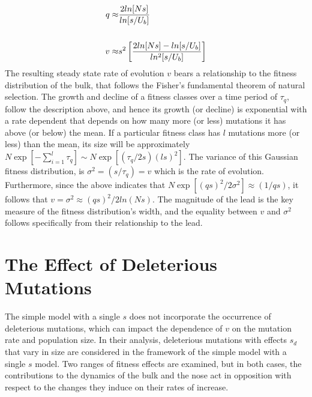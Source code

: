 \documentclass[12pt, two column]{article}
\begin{document}
\begin{equation}
\begin{aligned}
q \approx & {2ln[Ns] \over ln[s/U_b]} \\   
\\
v \approx & s^2 \left[{2ln[Ns] - ln[s/U_b] \over ln^2[s/U_b]}\right]
\end{aligned}
\end{equation} 
The resulting steady state rate of evolution $v$ bears a relationship to the fitness distribution of the bulk, that follows the Fisher's fundamental theorem of natural selection.  The growth and decline of a fitness classes over a time period of $\tau_q$, follow the description above, and hence its growth (or decline) is exponential with a rate dependent that depends on how many more (or less) mutations it has above (or below) the mean.  If a particular fitness class has $l$ mutations  more (or less) than the mean, its size will be approximately $N \exp[-\sum_{i=1}^{l} \tau_q] \sim N \exp[(\tau_q/2s)(ls)^2]$.  The variance of this Gaussian fitness distribution, is $\sigma^2 = (s/\tau_q)=v$ which is the rate of evolution.  Furthermore, since the above indicates that $N \exp[(qs)^2/2\sigma^2]\approx (1/qs)$, it follows that $v=\sigma^2 \approx (qs)^2/2ln(Ns)$.  The magnitude of the lead is the key measure of the fitness distribution's width, and the equality between $v$ and $\sigma^2$ follows specifically from their relationship to the lead.

\section*{The Effect of Deleterious Mutations}
The simple model with a single $s$ does not incorporate the occurrence of deleterious mutations, which can impact the dependence of $v$ on the mutation rate and population size.  In their analysis, deleterious mutations with effects $s_d$ that vary in size are considered in the framework of the simple model with a single $s$ model.  Two ranges of fitness effects are examined, but in both cases, the contributions to the dynamics of the bulk and the nose act in opposition with respect to the changes they induce on their rates of increase.   
\end{document}
